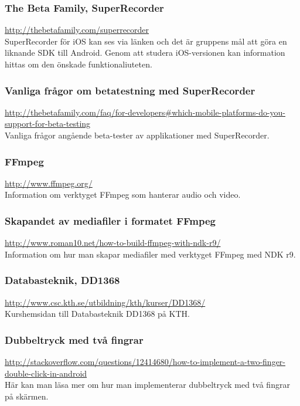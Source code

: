 \subsubsection{The Beta Family, SuperRecorder}
\url{http://thebetafamily.com/superrecorder} \\
SuperRecorder för iOS kan ses via länken och det är gruppens mål att göra en liknande SDK till Android. Genom att studera iOS-versionen kan information hittas om den önskade funktionaliuteten.

\subsubsection{Vanliga frågor om betatestning med SuperRecorder}
\url{http://thebetafamily.com/faq/for-developers\#which-mobile-platforms-do-you-support-for-beta-testing} \\
Vanliga frågor angående beta-tester av applikationer med SuperRecorder.

\subsubsection{FFmpeg}
\url{http://www.ffmpeg.org/} \\
Information om verktyget FFmpeg som hanterar audio och video.

\subsubsection{Skapandet av mediafiler i formatet FFmpeg}
\url{http://www.roman10.net/how-to-build-ffmpeg-with-ndk-r9/} \\
Information om hur man skapar mediafiler med verktyget FFmpeg med NDK r9.

\subsubsection{Databasteknik, DD1368}
\url{http://www.csc.kth.se/utbildning/kth/kurser/DD1368/} \\
Kurshemsidan till Databasteknik DD1368 på KTH.

\subsubsection{Dubbeltryck med två fingrar}
\url{http://stackoverflow.com/questions/12414680/how-to-implement-a-two-finger-double-click-in-android} \\
Här kan man läsa mer om hur man implementerar dubbeltryck med två fingrar på skärmen.

